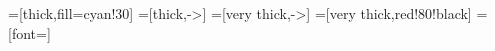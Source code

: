 \usepackage[lf]{carlito}
\usepackage{siunitx}
\usepackage[siunitx]{circuitikz}
\usepackage{tikz}
\usepackage{mathpazo}
\usepackage{bm}
\usepackage{mathtools}
\usepackage[ISO]{diffcoeff}
\usepackage{xcolor,colortbl}

\setlength{\parskip}{0pt}
\renewcommand{\baselinestretch}{1}


\tikzset{
  >=latex,
  voltage dir=RP,
}
=[thick,fill=cyan!30]
=[thick,->]
=[very thick,->]
=[very thick,red!80!black]
=[font=\footnotesize]

